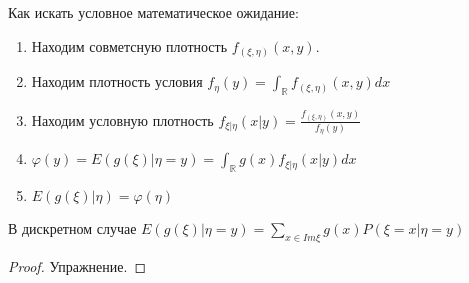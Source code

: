 \documentclass[document.tex]{subfiles}
\begin{document}
Как искать условное математическое ожидание:

\begin{enumerate}
    \item Находим совметсную плотность $f_{(\xi, \eta)} (x, y)$.
    \item Находим плотность условия $f_{\eta}(y) = \int_{\mathbb{R}}f_{(\xi, \eta)}(x, y) dx$
    \item Находим условную плотность $f_{\xi | \eta}(x|y) = \frac{f_{(\xi, \eta)}(x, y)}{f_{\eta}(y)}$
    \item $\varphi(y) = E(g(\xi) | \eta = y) = \int_{\mathbb{R}} g(x) f_{\xi | \eta}(x|y) dx$
    \item $E(g(\xi) | \eta) = \varphi(\eta)$
\end{enumerate}

\begin{statement}
    В дискретном случае $E(g(\xi) | \eta = y) = \sum_{x \in Im \xi} g(x) P (\xi = x | \eta = y)$
\end{statement}

\begin{proof}
    Упражнение.
\end{proof}
\end{document}
